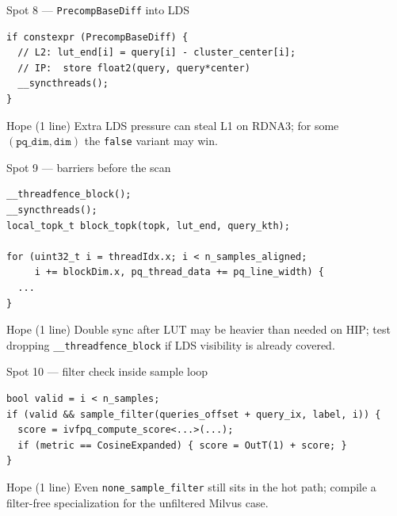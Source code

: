 \documentclass[aspectratio=169,10pt]{beamer}
\begin{document}
\begin{frame}[fragile]{Spot 8 --- \texttt{PrecompBaseDiff} into LDS}
\begin{lstlisting}
if constexpr (PrecompBaseDiff) {
  // L2: lut_end[i] = query[i] - cluster_center[i];
  // IP:  store float2(query, query*center)
  __syncthreads();
}
\end{lstlisting}
  \vspace{0.3em}
  \begin{alertblock}{Hope (1 line)}
    Extra LDS pressure can steal L1 on RDNA3; for some
    $(\texttt{pq\_dim},\texttt{dim})$ the \texttt{false} variant may win.
  \end{alertblock}
\end{frame}

\begin{frame}[fragile]{Spot 9 --- barriers before the scan}
\begin{lstlisting}
__threadfence_block();
__syncthreads();
local_topk_t block_topk(topk, lut_end, query_kth);

for (uint32_t i = threadIdx.x; i < n_samples_aligned;
     i += blockDim.x, pq_thread_data += pq_line_width) {
  ...
}
\end{lstlisting}
  \vspace{0.3em}
  \begin{alertblock}{Hope (1 line)}
    Double sync after LUT may be heavier than needed on HIP; test dropping
    \texttt{\_\_threadfence\_block} if LDS visibility is already covered.
  \end{alertblock}
\end{frame}

\begin{frame}[fragile]{Spot 10 --- filter check inside sample loop}
\begin{lstlisting}
bool valid = i < n_samples;
if (valid && sample_filter(queries_offset + query_ix, label, i)) {
  score = ivfpq_compute_score<...>(...);
  if (metric == CosineExpanded) { score = OutT(1) + score; }
}
\end{lstlisting}
  \vspace{0.3em}
  \begin{alertblock}{Hope (1 line)}
    Even \texttt{none\_sample\_filter} still sits in the hot path; compile a
    filter-free specialization for the unfiltered Milvus case.
  \end{alertblock}
\end{frame}
\end{document}
